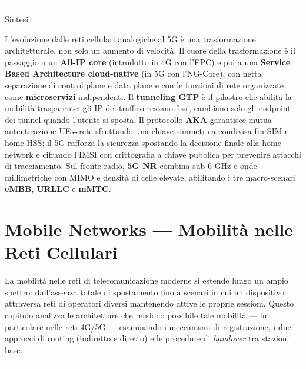 \documentclass[
  italian,
  openany]{book}
\begin{document}
\begin{center}\rule{0.5\linewidth}{0.5pt}\end{center}

\begin{calloutnote}{Sintesi}

L'evoluzione dalle reti cellulari analogiche al 5G è una trasformazione
architetturale, non solo un aumento di velocità. Il cuore della
trasformazione è il passaggio a un \textbf{All-IP core} (introdotto in
4G con l'EPC) e poi a una \textbf{Service Based Architecture
cloud-native} (in 5G con l'NG-Core), con netta separazione di control
plane e data plane e con le funzioni di rete organizzate come
\textbf{microservizi} indipendenti. Il \textbf{tunneling GTP} è il
pilastro che abilita la mobilità trasparente: gli IP del traffico
restano fissi, cambiano solo gli endpoint dei tunnel quando l'utente si
sposta. Il protocollo \textbf{AKA} garantisce mutua autenticazione
UE↔rete sfruttando una chiave simmetrica condivisa fra SIM e home HSS;
il 5G rafforza la sicurezza spostando la decisione finale alla home
network e cifrando l'IMSI con crittografia a chiave pubblica per
prevenire attacchi di tracciamento. Sul fronte radio, \textbf{5G NR}
combina sub-6 GHz e onde millimetriche con MIMO e densità di celle
elevate, abilitando i tre macro-scenari \textbf{eMBB}, \textbf{URLLC} e
\textbf{mMTC}.

\end{calloutnote}

\newpage

\chapter{Mobile Networks --- Mobilità nelle Reti
Cellulari}\label{mobile-networks-mobilituxe0-nelle-reti-cellulari}

La mobilità nelle reti di telecomunicazione moderne si estende lungo un
ampio spettro: dall'assenza totale di spostamento fino a scenari in cui
un dispositivo attraversa reti di operatori diversi mantenendo attive le
proprie sessioni. Questo capitolo analizza le architetture che rendono
possibile tale mobilità --- in particolare nelle reti 4G/5G ---
esaminando i meccanismi di registrazione, i due approcci di routing
(indiretto e diretto) e le procedure di \emph{handover} tra stazioni
base.

\begin{center}\rule{0.5\linewidth}{0.5pt}\end{center}
\end{document}
